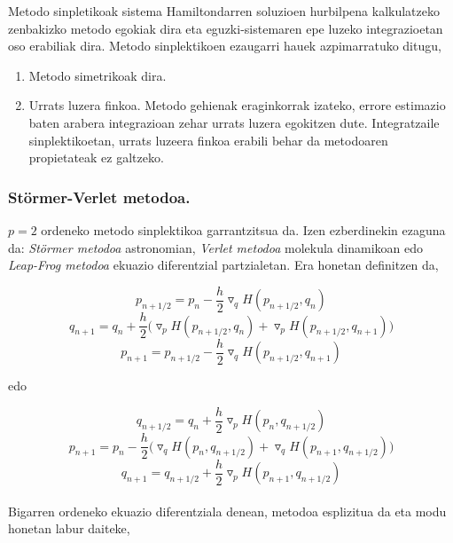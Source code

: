 Metodo sinpletikoak sistema Hamiltondarren soluzioen hurbilpena kalkulatzeko zenbakizko metodo egokiak dira eta eguzki-sistemaren epe luzeko integrazioetan oso erabiliak dira. Metodo sinplektikoen ezaugarri hauek azpimarratuko ditugu,

\begin{enumerate}

\item Metodo simetrikoak dira.

\item Urrats luzera finkoa. Metodo gehienak eraginkorrak izateko, errore estimazio baten arabera integrazioan zehar urrats luzera egokitzen dute. Integratzaile sinplektikoetan, urrats luzeera finkoa erabili behar da metodoaren propietateak ez galtzeko.  

\end{enumerate} 

\subsubsection*{Störmer-Verlet  metodoa.}

$p=2$ ordeneko metodo sinplektikoa garrantzitsua da. Izen ezberdinekin ezaguna da: \emph{Störmer metodoa} astronomian, \emph{Verlet metodoa} molekula dinamikoan edo \emph{Leap-Frog metodoa} ekuazio diferentzial partzialetan. Era honetan definitzen da, 

\[p_{{n+1}/{2}}=p_n-\frac{h}{2} \triangledown_q H(p_{{n+1}/{2}},q_n) \]
\begin{equation}
q_{n+1}=q_n+\frac{h}{2} \big(\triangledown_p H(p_{{n+1}/{2}},q_n)+ \triangledown_p H(p_{{n+1}/{2}},q_{n+1}) \big)
\end{equation}
\[p_{n+1}=p_{{n+1}/{2}}-\frac{h}{2} \triangledown_q H(p_{{n+1}/{2}},q_{n+1}) \]

edo

\[q_{{n+1}/{2}}=q_n+\frac{h}{2} \triangledown_p H(p_n,q_{{n+1}/{2}}) \]
\begin{equation}
p_{n+1}=p_n-\frac{h}{2} \big(\triangledown_q H(p_n,q_{{n+1}/{2}})+ \triangledown_q H(p_{n+1},q_{{n+1}/{2}}) \big)
\end{equation}
\[q_{n+1}=q_{{n+1}/{2}}+\frac{h}{2} \triangledown_p H(p_{n+1},q_{{n+1}/{2}}) \]


\paragraph*{}Bigarren ordeneko ekuazio diferentziala denean, metodoa esplizitua da eta modu honetan labur daiteke,

